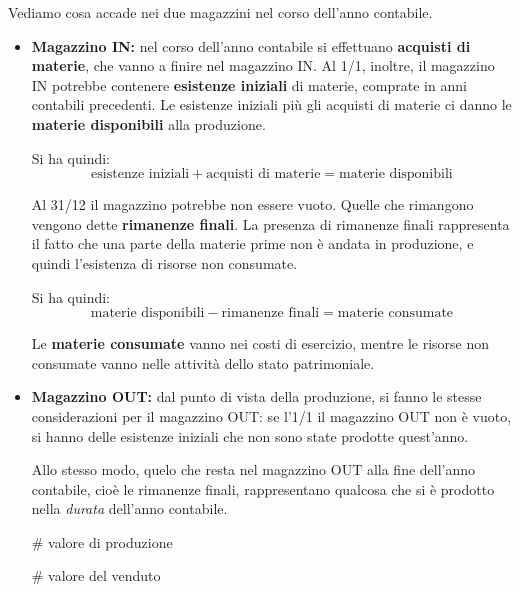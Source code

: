 \documentclass[a4paper,11pt]{article}
\begin{document}
Vediamo cosa accade nei due magazzini nel corso dell'anno contabile.

\begin{itemize}
	\item \textbf{Magazzino IN:}
nel corso dell'anno contabile si effettuano \textbf{acquisti di materie}, che vanno a finire nel magazzino IN.
Al 1/1, inoltre, il magazzino IN potrebbe contenere \textbf{esistenze iniziali} di materie, comprate in anni contabili precedenti.
Le esistenze iniziali più gli acquisti di materie ci danno le \textbf{materie disponibili} alla produzione.

Si ha quindi:
$$
\text{esistenze iniziali} + \text{acquisti di materie} = \text{materie disponibili}
$$

Al 31/12 il magazzino potrebbe non essere vuoto.
Quelle che rimangono vengono dette \textbf{rimanenze finali}.
La presenza di rimanenze finali rappresenta il fatto che una parte della materie prime non è andata in produzione, e quindi l'esistenza di risorse non consumate.

Si ha quindi:
$$
\text{materie disponibili} - \text{rimanenze finali} = \text{materie consumate}
$$

Le \textbf{materie consumate} vanno nei costi di esercizio, mentre le risorse non consumate vanno nelle attività dello stato patrimoniale.

\item \textbf{Magazzino OUT:}
dal punto di vista della produzione, si fanno le stesse considerazioni per il magazzino OUT: se l'1/1 il magazzino OUT non è vuoto, si hanno delle esistenze iniziali che non sono state prodotte quest'anno.

Allo stesso modo, quelo che resta nel magazzino OUT alla fine dell'anno contabile, cioè le rimanenze finali, rappresentano qualcosa che si è prodotto nella \textit{durata} dell'anno contabile.

# valore di produzione

# valore del venduto

\end{itemize}
\end{document}
